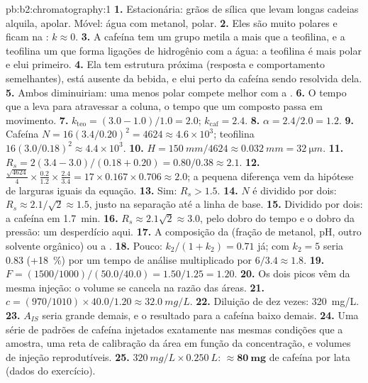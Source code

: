 \begin{solution}{pb:b2:chromatography:1}
\textbf{1.} Estacionária: grãos de sílica que levam longas cadeias alquila, apolar. Móvel: água com
metanol, polar.
\textbf{2.} Eles são muito polares e ficam na : $k \approx 0$.
\textbf{3.} A cafeína tem um grupo metila a mais que a teofilina, e a teofilina um  que forma
ligações de hidrogênio com a água: a teofilina é mais polar e elui primeiro.
\textbf{4.} Ela tem estrutura próxima (resposta e comportamento semelhantes), está ausente da bebida, e
elui perto da cafeína sendo resolvida dela.
\textbf{5.} Ambos diminuiriam: uma  menos polar compete melhor com a .
\textbf{6.} O tempo que a  leva para atravessar a coluna, o tempo que um composto passa em movimento.
\textbf{7.} $k_{\mathrm{teo}} = (3.0 - 1.0)/1.0 = 2.0$; $k_{\mathrm{caf}} = 2.4$.
\textbf{8.} $\alpha = 2.4/2.0 = 1.2$.
\textbf{9.} Cafeína $N = 16(3.4/0.20)^2 = 4624 \approx 4.6 \times 10^3$; teofilina $16(3.0/0.18)^2
\approx 4.4 \times 10^3$.
\textbf{10.} $H = \qty{150}{mm}/4624 \approx \qty{0.032}{mm} = \qty{32}{\micro m}$.
\textbf{11.} $R_s = 2(3.4 - 3.0)/(0.18 + 0.20) = 0.80/0.38 \approx 2.1$.
\textbf{12.} $\frac{\sqrt{4624}}{4} \times \frac{0.2}{1.2} \times \frac{2.4}{3.4} = 17 \times 0.167 \times
0.706 \approx 2.0$; a pequena diferença vem da hipótese de larguras iguais da equação.
\textbf{13.} Sim: $R_s > 1.5$.
\textbf{14.} $N$ é dividido por dois: $R_s \approx 2.1/\sqrt2 \approx 1.5$, justo na separação até a linha de base.
\textbf{15.} Dividido por dois: a cafeína em \qty{1.7}{min}.
\textbf{16.} $R_s \approx 2.1\sqrt2 \approx 3.0$, pelo dobro do tempo e o dobro da pressão: um desperdício aqui.
\textbf{17.} A composição da  (fração de metanol, pH, outro solvente orgânico) ou a
.
\textbf{18.} Pouco: $k_2/(1 + k_2) = 0.71$ já; com $k_2 = 5$ seria 0.83 (+18~\%) por um
tempo de análise multiplicado por $6/3.4 \approx 1.8$.
\textbf{19.} $F = (1500/1000)/(50.0/40.0) = 1.50/1.25 = 1.20$.
\textbf{20.} Os dois picos vêm da mesma injeção: o volume se cancela na razão das áreas.
\textbf{21.} $c = (970/1010) \times 40.0/1.20 \approx \qty{32.0}{mg/L}$.
\textbf{22.} Diluição de dez vezes: \qty{320}{mg/L}.
\textbf{23.} $A_{IS}$ seria grande demais, e o resultado para a cafeína baixo demais.
\textbf{24.} Uma série de padrões de cafeína injetados exatamente nas mesmas condições que a amostra, uma
reta de calibração da área em função da concentração, e volumes de injeção reprodutíveis.
\textbf{25.} $\qty{320}{mg/L} \times \qty{0.250}{L}$: $\boldsymbol{\approx \qty{80}{mg}}$ de cafeína por lata (dados do
exercício).
\end{solution}

